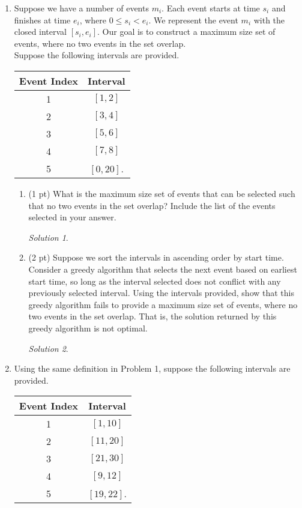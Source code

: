 \documentclass[12pt]{article}
\theoremstyle{remark}
\newtheorem*{solution}{Solution}
\begin{document}
\hrulefill

\newpage
\begin{enumerate}



\item Suppose we have a number of events $m_{i}$. Each event starts at time $s_{i}$ and finishes at time $e_{i}$, where $0 \leq s_{i} < e_{i}$. We represent the event $m_{i}$ with the closed interval $[s_{i}, e_{i}].$ Our goal is to construct a maximum size set of events, where no two events in the set overlap. \\

\noindent Suppose the following intervals are provided.
\begin{center}
\begin{tabular}{c|c}
Event Index & Interval \\ \hline
1 & $[1, 2]$ \\ 
2 & $[3, 4]$ \\
3 & $[5, 6]$ \\
4 & $[7, 8]$ \\
5 & $[0, 20]$.
\end{tabular}
\end{center}

\begin{enumerate}[label=(\alph*)]
\item (1 pt) What is the maximum size set of events that can be selected such that no two events in the set overlap? Include the list of the events selected in your answer.
\begin{solution}

\end{solution}

\newpage
\item (2 pt) Suppose we sort the intervals in ascending order by start time. Consider a greedy algorithm that selects the next event based on earliest start time, so long as the interval selected does not conflict with any previously selected interval. Using the intervals provided, show that this greedy algorithm fails to provide a maximum size set of events, where no two events in the set overlap. That is, the solution returned by this greedy algorithm is not optimal.
\begin{solution}

\end{solution}
\end{enumerate}


\newpage
\item Using the same definition in Problem 1, suppose the following intervals are provided.
\begin{center}
\begin{tabular}{c|c}
Event Index & Interval \\ \hline
1 & $[1, 10]$ \\ 
2 & $[11, 20]$ \\
3 & $[21, 30]$ \\
4 & $[9, 12]$ \\
5 & $[19, 22]$.
\end{tabular}
\end{center}


\end{enumerate}
\end{document}
